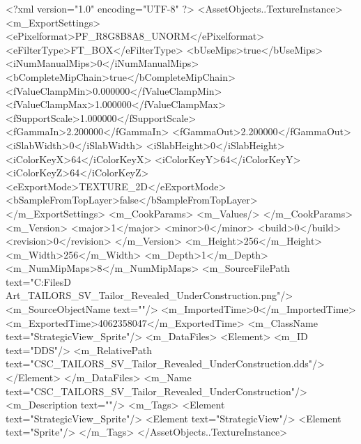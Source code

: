 <?xml version="1.0" encoding="UTF-8" ?>
<AssetObjects..TextureInstance>
	<m_ExportSettings>
		<ePixelformat>PF_R8G8B8A8_UNORM</ePixelformat>
		<eFilterType>FT_BOX</eFilterType>
		<bUseMips>true</bUseMips>
		<iNumManualMips>0</iNumManualMips>
		<bCompleteMipChain>true</bCompleteMipChain>
		<fValueClampMin>0.000000</fValueClampMin>
		<fValueClampMax>1.000000</fValueClampMax>
		<fSupportScale>1.000000</fSupportScale>
		<fGammaIn>2.200000</fGammaIn>
		<fGammaOut>2.200000</fGammaOut>
		<iSlabWidth>0</iSlabWidth>
		<iSlabHeight>0</iSlabHeight>
		<iColorKeyX>64</iColorKeyX>
		<iColorKeyY>64</iColorKeyY>
		<iColorKeyZ>64</iColorKeyZ>
		<eExportMode>TEXTURE_2D</eExportMode>
		<bSampleFromTopLayer>false</bSampleFromTopLayer>
	</m_ExportSettings>
	<m_CookParams>
		<m_Values/>
	</m_CookParams>
	<m_Version>
		<major>1</major>
		<minor>0</minor>
		<build>0</build>
		<revision>0</revision>
	</m_Version>
	<m_Height>256</m_Height>
	<m_Width>256</m_Width>
	<m_Depth>1</m_Depth>
	<m_NumMipMaps>8</m_NumMipMaps>
	<m_SourceFilePath text="C:\Users\Shadow\Desktop\Working Files\2D Art\Quarters\Tailors\StrategicView\CSC_TAILORS_SV_Tailor_Revealed_UnderConstruction.png"/>
	<m_SourceObjectName text=""/>
	<m_ImportedTime>0</m_ImportedTime>
	<m_ExportedTime>4062358047</m_ExportedTime>
	<m_ClassName text="StrategicView_Sprite"/>
	<m_DataFiles>
		<Element>
			<m_ID text="DDS"/>
			<m_RelativePath text="CSC_TAILORS_SV_Tailor_Revealed_UnderConstruction.dds"/>
		</Element>
	</m_DataFiles>
	<m_Name text="CSC_TAILORS_SV_Tailor_Revealed_UnderConstruction"/>
	<m_Description text=""/>
	<m_Tags>
		<Element text="StrategicView_Sprite"/>
		<Element text="StrategicView"/>
		<Element text="Sprite"/>
	</m_Tags>
</AssetObjects..TextureInstance>

